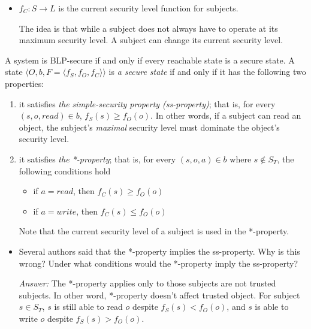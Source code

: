 \documentclass[11pt]{article}
\newcommand{\tuple}[1]{\ensuremath{\langle #1 \rangle}\xspace}
\newcommand{\rea}{read}
\newcommand{\wri}{write}
\begin{document}
\begin{description}
\begin{itemize}
\begin{itemize}
 \item
$f_C: S \longrightarrow L$ is the current security level function for subjects.

The idea is that while a subject does not always have to operate at its maximum
security level.  A subject can change its current security level.
\end{itemize}
\end{itemize}

A system is BLP-secure if and only if every reachable state is a secure state. A
state $\tuple{O,b,F=\tuple{f_S,f_O,f_C}}$ is \emph{a secure state} if and only if it
has the following two properties:
\begin{enumerate}
 \item
it satisfies \emph{the simple-security property (ss-property)}; that is, for every
$(s,o,\rea)\in b$, $f_S(s) \geq f_O(o)$. In other words, if a subject can read an
object, the subject's \emph{maximal} security level must dominate the object's
security level.

 \item
it satisfies \emph{the *-property}; that is, for every $(s,o,a)\in b$ where $s\not\in
S_T$, the following conditions hold
\begin{itemize}
 \item
if $a=\rea$, then $f_C(s) \geq f_O(o)$

 \item
if $a=\wri$, then $f_C(s) \leq f_O(o)$
\end{itemize}

Note that the current security level of a subject is used in the *-property.
\end{enumerate}

{\bf
\begin{itemize}
 \item
Several authors said that the *-property implies the ss-property.  Why is this wrong?
Under what conditions would the *-property imply the ss-property?
\begin{mdframed}
	\textit{Answer:} The *-property applies only to those subjects are not trusted subjects. In other word, *-property doesn't affect trusted object. For subject $s\in S_T$, $s$ is still able to read $o$ despite $f_S(s) < f_O(o)$, and $s$ is able to write $o$ despite $f_S(s) > f_O(o)$.


\end{mdframed}
\end{itemize}}
\end{description}
\end{document}
